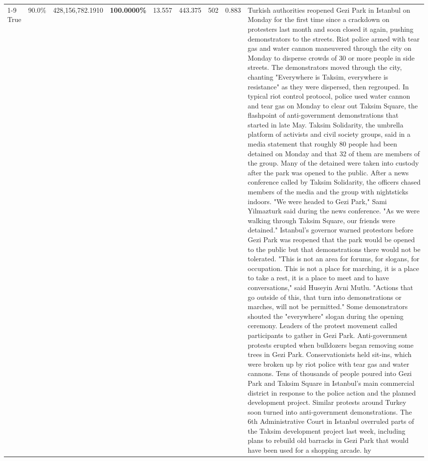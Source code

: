 \begin{table}[H]
\begin{tabular}{lllrlllll}
\cline{1-9}
True & 90.0\% & 428,156,782.1910 & \bfseries \color{red} 100.0000\% & 13.557 & 443.375 & 502 & 0.883 & Turkish authorities reopened Gezi Park in Istanbul on Monday for the first time since a crackdown on protesters last month and soon closed it again, pushing demonstrators to the streets. Riot police armed with tear gas and water cannon maneuvered through the city on Monday to disperse crowds of 30 or more people in side streets. The demonstrators moved through the city, chanting "Everywhere is Taksim, everywhere is resistance" as they were dispersed, then regrouped. In typical riot control protocol, police used water cannon and tear gas on Monday to clear out Taksim Square, the flashpoint of anti-government demonstrations that started in late May. Taksim Solidarity, the umbrella platform of activists and civil society groups, said in a media statement that roughly 80 people had been detained on Monday and that 32 of them are members of the group. Many of the detained were taken into custody after the park was opened to the public. After a news conference called by Taksim Solidarity, the officers chased members of the media and the group with nightsticks indoors. "We were headed to Gezi Park," Sami Yilmazturk said during the news conference. "As we were walking through Taksim Square, our friends were detained." Istanbul's governor warned protestors before Gezi Park was reopened that the park would be opened to the public but that demonstrations there would not be tolerated. "This is not an area for forums, for slogans, for occupation. This is not a place for marching, it is a place to take a rest, it is a place to meet and to have conversations," said Huseyin Avni Mutlu. "Actions that go outside of this, that turn into demonstrations or marches, will not be permitted." Some demonstrators shouted the "everywhere" slogan during the opening ceremony. Leaders of the protest movement called participants to gather in Gezi Park. Anti-government protests erupted when bulldozers began removing some trees in Gezi Park. Conservationists held sit-ins, which were broken up by riot police with tear gas and water cannons. Tens of thousands of people poured into Gezi Park and Taksim Square in Istanbul's main commercial district in response to the police action and the planned development project. Similar protests around Turkey soon turned into anti-government demonstrations. The 6th Administrative Court in Istanbul overruled parts of the Taksim development project last week, including plans to rebuild old barracks in Gezi Park that would have been used for a shopping arcade. hy \\

\end{tabular}
\end{table}
